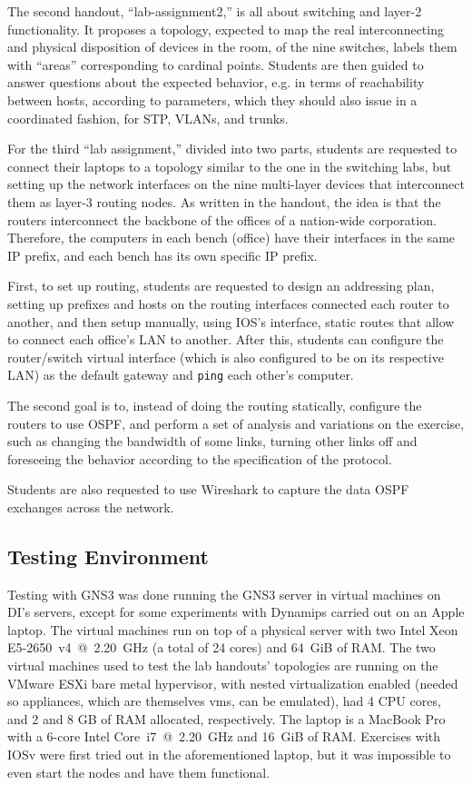 The second handout, ``lab-assignment2,'' is all about switching and layer-2 functionality.
It proposes a topology, expected to map the real interconnecting and physical disposition of devices in the room, of the nine switches, labels them with ``areas'' corresponding to cardinal points.
Students are then guided to answer questions about the expected behavior, e.g. in terms of reachability between hosts, according to parameters, which they should also issue in a coordinated fashion, for STP, VLANs, and trunks.

For the third ``lab assignment,'' divided into two parts, students are requested to connect their laptops to a topology similar to the one in the switching labs, but setting up the network interfaces on the nine multi-layer devices that interconnect them as layer-3 routing nodes.
As written in the handout, the idea is that the routers interconnect the backbone of the offices of a nation-wide corporation.
Therefore, the computers in each bench (office) have their interfaces in the same IP prefix, and each bench has its own specific IP prefix.

First, to set up routing, students are requested to design an addressing plan, setting up prefixes and hosts on the routing interfaces connected each router to another, and then setup manually, using IOS's interface, static routes that allow to connect each office's LAN to another.
After this, students can configure the router/switch virtual interface (which is also configured to be on its respective LAN) as the default gateway and \texttt{ping} each other's computer.

The second goal is to, instead of doing the routing statically, configure the routers to use OSPF, and perform a set of analysis and variations on the exercise, such as changing the bandwidth of some links, turning other links off and foreseeing the behavior according to the specification of the protocol.

Students are also requested to use Wireshark to capture the data OSPF exchanges across the network.

\subsection{Testing Environment}
\label{subsec:environment}

Testing with GNS3 was done running the GNS3 server in virtual machines on DI's servers, except for some experiments with Dynamips carried out on an Apple laptop. %
The virtual machines run on top of a physical server with two Intel Xeon E5-2650~v4~@~2.20~GHz (a total of 24 cores) and 64~GiB of RAM.
The two virtual machines used to test the lab handouts' topologies are running on the VMware ESXi bare metal hypervisor, with nested virtualization enabled (needed so appliances, which are themselves \glspl{vm}, can be emulated), had 4 CPU cores, and 2 and 8 GB of RAM allocated, respectively.
The laptop is a MacBook Pro with a 6-core Intel Core~i7~@~2.20~GHz and 16~GiB of RAM.
Exercises with IOSv were first tried out in the aforementioned laptop, but it was impossible to even start the nodes and have them functional.

